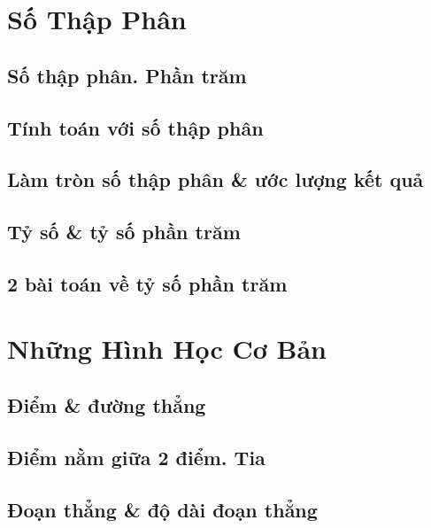 \documentclass{article}
\numberwithin{equation}{section}
\begin{document}

\section{Số Thập Phân}

\subsection{Số thập phân. Phần trăm}

\subsection{Tính toán với số thập phân}

\subsection{Làm tròn số thập phân \& ước lượng kết quả}

\subsection{Tỷ số \& tỷ số phần trăm}

\subsection{2 bài toán về tỷ số phần trăm}


\newpage
\section{Những Hình Học Cơ Bản}

\subsection{Điểm \& đường thẳng}

\subsection{Điểm nằm giữa 2 điểm. Tia}

\subsection{Đoạn thẳng \& độ dài đoạn thẳng}
\end{document}
